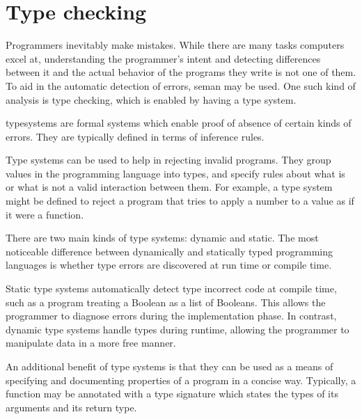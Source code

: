 \section{Type checking}

Programmers inevitably make mistakes. While there are many tasks computers excel at, understanding the programmer's intent and detecting differences between it and the actual behavior of the programs they write is not one of them. To aid in the automatic detection of errors, \gls{seman} may be used. One such kind of analysis is type checking, which is enabled by having a type system.

\Glspl{typesystem} are formal systems which enable proof of absence of certain kinds of errors. They are typically defined in terms of inference rules.

Type systems can be used to help in rejecting invalid programs. They group values in the programming language into types, and specify rules about what is or what is not a valid interaction between them. For example, a type system might be defined to reject a program that tries to apply a number to a value as if it were a function.

There are two main kinds of type systems: dynamic and static. The most noticeable difference between dynamically and statically typed programming languages is whether type errors are discovered at run time or compile time.

Static type systems automatically detect type incorrect code at compile time, such as a program treating a Boolean as a list of Booleans. This allows the programmer to diagnose errors during the implementation phase. In contrast, dynamic type systems handle types during runtime, allowing the programmer to manipulate data in a more free manner.

An additional benefit of type systems is that they can be used as a means of specifying and documenting properties of a program in a concise way. Typically, a function may be annotated with a type signature which states the types of its arguments and its return type.



